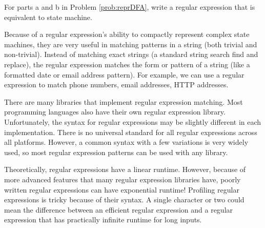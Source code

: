 \begin{problem}
For parts a and b in Problem \ref{prob:reprDFA}, write a  regular expression that is equivalent to state machine.
\label{prob:equiv_regex}
\end{problem}

Because of a regular expression's ability to compactly represent complex state machines, they are very useful in matching patterns in a string (both trivial and non-trivial).
Instead of matching exact strings (a standard string search find and replace), the regular expression matches the form or pattern of a string (like a formatted date or email address pattern).
For example, we can use a regular expression to match phone numbers, email addresses, HTTP addresses.

There are many libraries that implement regular expression matching.
Most programming languages also have their own regular expression library.
Unfortunately, the syntax for regular expressions may be slightly different in each implementation. 
There is no universal standard for all regular expressions across all platforms. 
However, a common syntax with a few variations is very widely used, so most regular expression patterns can be used with any library.

\begin{warn}
Theoretically, regular expressions have a linear runtime.
However, because of more advanced features that many regular expression libraries have, poorly written regular expressions can have exponential runtime!
Profiling regular expressions is tricky because of their syntax.
A single character or two  could mean the difference between an efficient regular expression and a regular expression that has practically infinite runtime for long inputs.
\end{warn}

